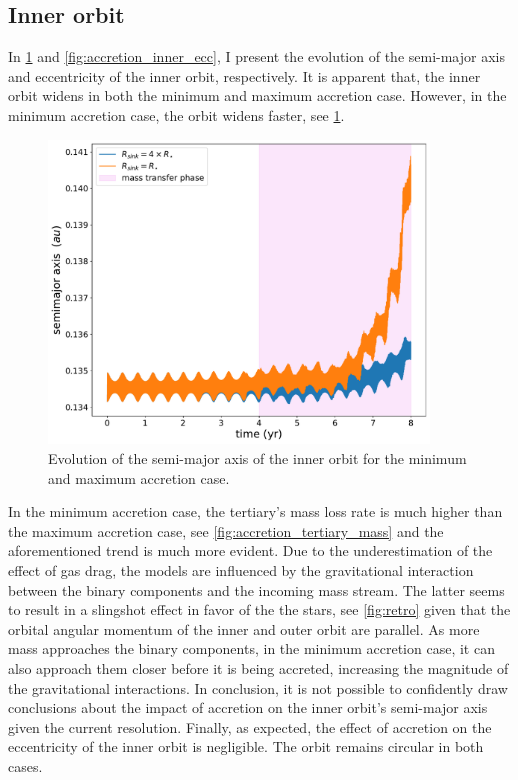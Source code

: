 \subsection{Inner orbit}

In \cref{fig:accretion_inner_semimajor_axis} and \cref{fig:accretion_inner_ecc}, I present the evolution of the semi-major axis and eccentricity of the inner orbit, 
respectively. It is apparent that, the inner orbit widens in both the minimum and maximum accretion case. However, in the minimum accretion case, the orbit widens faster, see \cref{fig:accretion_inner_semimajor_axis}.
\begin{figure}[H]
    \centering
    \includegraphics[width=0.9\textwidth]{Thesis/graphs/accretion_case/accretion_inner_semimajor_axis.pdf}
    \caption{Evolution of the semi-major axis of the inner orbit for the minimum and maximum accretion case.}
    \label{fig:accretion_inner_semimajor_axis}
\end{figure}
In the minimum accretion case, the tertiary's mass loss rate is much higher than the maximum accretion case, see \cref{fig:accretion_tertiary_mass} and the aforementioned trend is much more evident. Due to the underestimation of the effect of gas drag, the models are influenced by the gravitational interaction between the binary components and the incoming mass stream. The latter seems to result in a slingshot effect in favor of the the stars, see \cref{fig:retro} given that the orbital angular momentum of the inner and outer orbit are parallel. As more mass approaches the binary components, in the minimum accretion case, it can also approach them closer before it is being accreted, increasing the magnitude of the gravitational interactions. In conclusion, it is not possible to confidently draw conclusions about the impact of accretion on the inner orbit's semi-major axis given the current resolution. Finally, as expected, the effect of accretion on the eccentricity of the inner orbit is negligible. The orbit remains circular in both cases.

